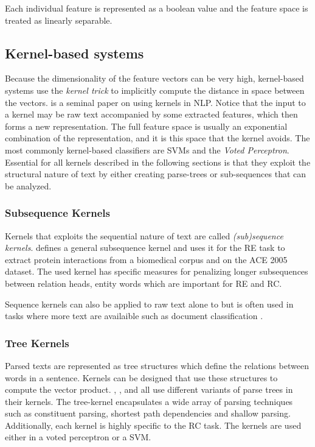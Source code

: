 Each individual feature is represented as a boolean value and the feature space is treated as linearly separable. 

\subsection{Kernel-based systems}

Because the dimensionality of the feature vectors can be very high, kernel-based systems use the \emph{kernel trick} to implicitly compute the distance in space between the vectors. \cite{collins2001} is a seminal paper on using kernels in NLP. Notice that the input to a kernel may be raw text accompanied by some extracted features, which then forms a new representation. The full feature space is usually an exponential combination of the representation, and it is this space that the kernel avoids. The most commonly kernel-based classifiers are SVMs and the \emph{Voted Perceptron}\cite{freund1999}.   
Essential for all kernels described in the following sections is that they exploit the structural nature of text by either creating parse-trees or sub-sequences that can be analyzed. 

\subsubsection{Subsequence Kernels}

Kernels that exploits the sequential nature of text are called \emph{(sub)sequence kernels}. \cite{subsequence_kernel} defines a general subsequence kernel and uses it for the RE task to extract protein interactions from a biomedical corpus and on the ACE 2005 dataset. The used kernel has specific measures for penalizing longer subsequences between relation heads, entity words which are important for RE and RC. 

Sequence kernels can also be applied to raw text alone to but is often used in tasks where more text are availaible such as document classification \cite{lodhi2002}.  

\subsubsection{Tree Kernels}

Parsed texts are represented as tree structures which define the relations between words in a sentence. Kernels can be designed that use these structures to compute the vector product. \cite{zelenko2003}, \cite{bunescu2005}, \cite{qian2008} and \cite{plank2013} all use different variants of parse trees in their kernels. The tree-kernel encapsulates a wide array of parsing techniques such as constituent parsing, shortest path dependencies and shallow parsing. Additionally, each kernel is highly specific to the RC task. The kernels are used either in a voted perceptron or a SVM.  


